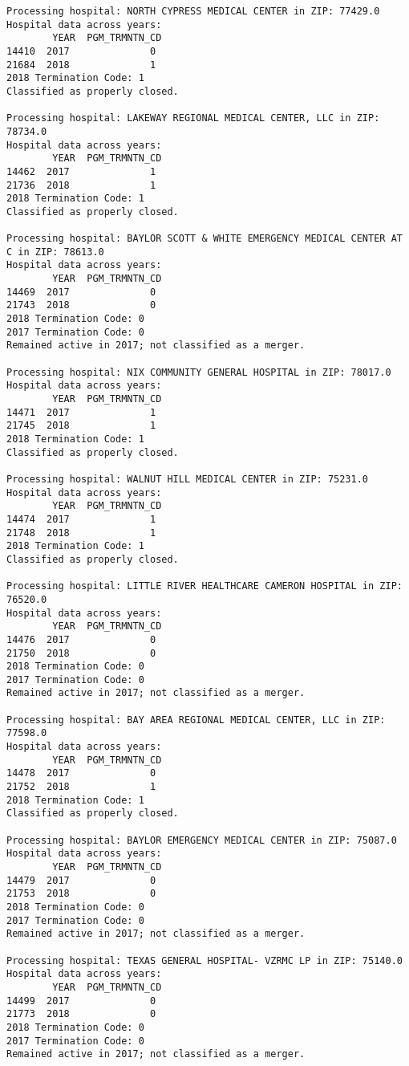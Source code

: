 \documentclass[
  letterpaper,
  DIV=11,
  numbers=noendperiod]{scrartcl}
\begin{document}
\begin{verbatim}
Processing hospital: NORTH CYPRESS MEDICAL CENTER in ZIP: 77429.0
Hospital data across years:
        YEAR  PGM_TRMNTN_CD
14410  2017              0
21684  2018              1
2018 Termination Code: 1
Classified as properly closed.

Processing hospital: LAKEWAY REGIONAL MEDICAL CENTER, LLC in ZIP: 78734.0
Hospital data across years:
        YEAR  PGM_TRMNTN_CD
14462  2017              1
21736  2018              1
2018 Termination Code: 1
Classified as properly closed.

Processing hospital: BAYLOR SCOTT & WHITE EMERGENCY MEDICAL CENTER AT C in ZIP: 78613.0
Hospital data across years:
        YEAR  PGM_TRMNTN_CD
14469  2017              0
21743  2018              0
2018 Termination Code: 0
2017 Termination Code: 0
Remained active in 2017; not classified as a merger.

Processing hospital: NIX COMMUNITY GENERAL HOSPITAL in ZIP: 78017.0
Hospital data across years:
        YEAR  PGM_TRMNTN_CD
14471  2017              1
21745  2018              1
2018 Termination Code: 1
Classified as properly closed.

Processing hospital: WALNUT HILL MEDICAL CENTER in ZIP: 75231.0
Hospital data across years:
        YEAR  PGM_TRMNTN_CD
14474  2017              1
21748  2018              1
2018 Termination Code: 1
Classified as properly closed.

Processing hospital: LITTLE RIVER HEALTHCARE CAMERON HOSPITAL in ZIP: 76520.0
Hospital data across years:
        YEAR  PGM_TRMNTN_CD
14476  2017              0
21750  2018              0
2018 Termination Code: 0
2017 Termination Code: 0
Remained active in 2017; not classified as a merger.

Processing hospital: BAY AREA REGIONAL MEDICAL CENTER, LLC in ZIP: 77598.0
Hospital data across years:
        YEAR  PGM_TRMNTN_CD
14478  2017              0
21752  2018              1
2018 Termination Code: 1
Classified as properly closed.

Processing hospital: BAYLOR EMERGENCY MEDICAL CENTER in ZIP: 75087.0
Hospital data across years:
        YEAR  PGM_TRMNTN_CD
14479  2017              0
21753  2018              0
2018 Termination Code: 0
2017 Termination Code: 0
Remained active in 2017; not classified as a merger.

Processing hospital: TEXAS GENERAL HOSPITAL- VZRMC LP in ZIP: 75140.0
Hospital data across years:
        YEAR  PGM_TRMNTN_CD
14499  2017              0
21773  2018              0
2018 Termination Code: 0
2017 Termination Code: 0
Remained active in 2017; not classified as a merger.


\end{verbatim}
\end{document}
